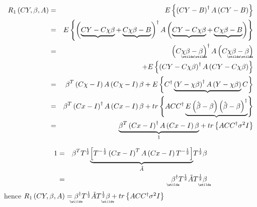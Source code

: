 \documentclass{article}
\begin{document}
\begin{eqnarray}
R_{1}\left( CY,\beta ,A\right) &=&E\left\{ \left( CY-B\right) ^{\dagger
}A\left( CY-B\right) \right\}  \notag \\
&=&E\left\{ \left( \underbrace{CY-C\chi \beta }+\underbrace{C\chi \beta -B}%
\right) ^{\dagger }A\left( \underbrace{CY-C\chi \beta }+\underbrace{C\chi
\beta -B}\right) \right\}  \notag \\
&=&\left( C\chi 
\underaccent{\wtilde}{\beta}%
-%
\underaccent{\wtilde}{\beta}%
\right) ^{\dagger }A\left( C\chi 
\underaccent{\wtilde}{\beta}%
-%
\underaccent{\wtilde}{\beta}%
\right)  \notag \\
&&+E\left\{ \left( CY-C\chi \beta \right) ^{\dagger }A\left( CY-C\chi \beta
\right) \right\}  \notag \\
&=&\beta ^{T}\left( C\chi -I\right) A\left( C\chi -I\right) \beta +E\left\{
C^{\dagger }\underbrace{\left( Y-\chi \beta \right) ^{\dagger }A\left(
Y-\chi \beta \right) }C\right\}  \notag \\
&=&\beta ^{T}\left( Cx-I\right) ^{\dagger }A\left( Cx-I\right) \beta
+tr\left\{ ACC^{\dagger }\underbrace{E\left( \hat{\beta}-\beta \right)
\left( \hat{\beta}-\beta \right) ^{\dagger }}\right\}  \notag \\
&=&\underset{1}{\underbrace{\beta ^{T}\left( Cx-I\right) ^{\dagger }A\left(
Cx-I\right) \beta }}+tr\left\{ ACC^{\dagger }\sigma ^{2}I\right\}
\end{eqnarray}

\begin{eqnarray*}
1 &=&\beta ^{T}T^{\frac{1}{2}}\underset{\tilde{A}}{\underbrace{\left[ T^{-%
\frac{1}{2}}\left( Cx-I\right) ^{T}A\left( Cx-I\right) T^{-\frac{1}{2}}%
\right] }}T^{\frac{1}{2}}\beta \\
&=&%
\underaccent{\wtilde}{\beta}%
^{\dagger }T^{\frac{1}{2}}\tilde{A}T^{\frac{1}{2}}%
\underaccent{\wtilde}{\beta}%
\end{eqnarray*}%
hence $R_{1}\left( CY,\beta ,A\right) =%
\underaccent{\wtilde}{\beta}%
^{\dagger }T^{\frac{1}{2}}\tilde{A}T^{\frac{1}{2}}%
\underaccent{\wtilde}{\beta}%
+tr\left\{ ACC^{\dagger }\sigma ^{2}I\right\} $
\end{document}

